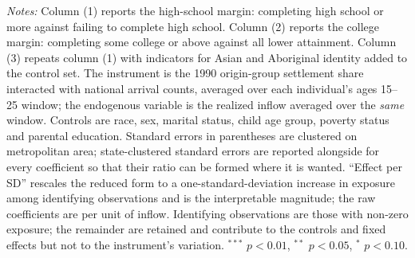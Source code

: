 \begin{table}[!htbp]
\begin{minipage}{\textwidth}
\textit{Notes:} Column (1) reports the high-school margin: completing high school or more against failing to complete high school. Column (2) reports the college margin: completing some college or above against all lower attainment. Column (3) repeats column (1) with indicators for Asian and Aboriginal identity added to the control set. The instrument is the 1990 origin-group settlement share interacted with national arrival counts, averaged over each individual's ages 15--25 window; the endogenous variable is the realized inflow averaged over the \emph{same} window. Controls are race, sex, marital status, child age group, poverty status and parental education. Standard errors in parentheses are clustered on metropolitan area; state-clustered standard errors are reported alongside for every coefficient so that their ratio can be formed where it is wanted. ``Effect per SD'' rescales the reduced form to a one-standard-deviation increase in exposure among identifying observations and is the interpretable magnitude; the raw coefficients are per unit of inflow. Identifying observations are those with non-zero exposure; the remainder are retained and contribute to the controls and fixed effects but not to the instrument's variation. $^{***}$ $p<0.01$, $^{**}$ $p<0.05$, $^{*}$ $p<0.10$.
\end{minipage}
\end{table}

